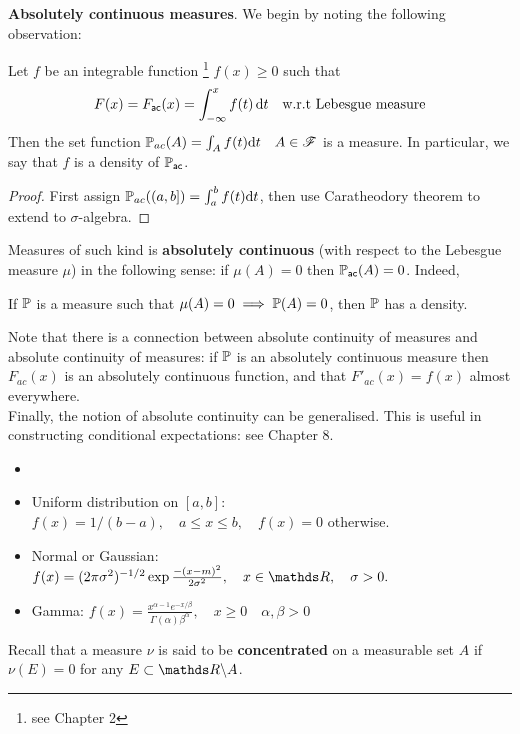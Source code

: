 \textbf{Absolutely continuous measures}. We begin by noting the following observation:
\begin{proposition}
Let $f$ be an integrable function \footnote{see Chapter 2} $f(x) \ge 0$ such that
\begin{equation*}
    F(x) = F_{\mathsf{ac}}(x) = \int_{-\infty}^x f(t) \, \mathrm{d} t \quad \text{w.r.t Lebesgue measure}
\end{equation*}
Then the set function $\mathbb{P}_{ac}(A) = \int_{A} f(t)\mathrm{d} t \quad A \in \mathcal{F}$ is a measure. In particular, we say that $f$ is a density of $\mathbb{P}_{\mathsf{ac}}$.
\end{proposition}
\begin{proof}
First assign $\mathbb{P}_{ac}((a,b]) = \int_a^bf(t)\mathrm{d} t$, then use Caratheodory theorem to extend to $\sigma$-algebra.
\end{proof}
Measures of such kind is \textbf{absolutely continuous} (with respect to the Lebesgue measure $\mu$) in the following sense: if $\mu(A) = 0$ then $\mathbb{P}_{\mathsf{ac}}(A) = 0$. Indeed,

\begin{theorem} If $\mathbb{P}$ is a measure such that $\mu(A) = 0\implies \mathbb{P}(A) = 0$, then $\mathbb{P}$ has a density.
\end{theorem}

Note that there is a connection between absolute continuity of measures and absolute continuity of measures: if $\mathbb{P}$ is an absolutely continuous measure then $F_{ac}(x)$ is an absolutely continuous function, and that $F'_{ac}(x) = f(x)$ almost everywhere.\\

Finally, the notion of absolute continuity can be generalised. This is useful in constructing conditional expectations: see Chapter 8.

\begin{example}
\begin{itemize}
    \item[]
    \item Uniform distribution on $[a,b]$: $f(x) = 1/(b-a), \quad a\le x \le b, \quad f(x) = 0$ otherwise.
    \item Normal or Gaussian: $f(x) = (2\pi \sigma^2)^{-1/2}\exp{\frac{-(x-m)^2}{2\sigma^2}}, \quad x \in \R, \quad \sigma >0.$
    \item Gamma: $f(x) = \frac{x^{\alpha - 1}e^{-x/\beta}}{\Gamma(\alpha)\beta^\alpha}, \quad x \ge 0 \quad \alpha, \beta >0$
\end{itemize}
\end{example}
Recall that a measure $\nu$ is said to be \textbf{concentrated} on a measurable set $A$ if $\nu(E) = 0$ for any $E \subset \R\backslash A$.\\

